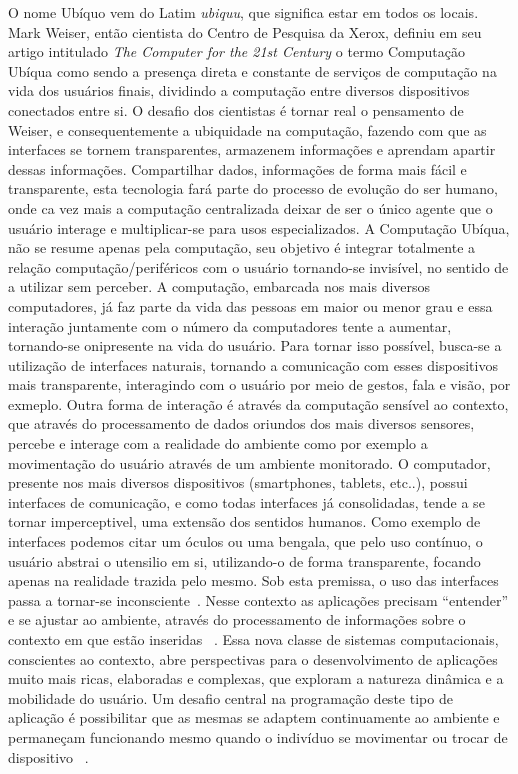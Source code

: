 \documentclass[12pt,a4paper,compsoc]{IEEEtran}
\begin{document}
O nome Ubíquo vem do Latim \textit{ubiquu}, que significa estar em todos os locais.    
Mark Weiser, então cientista do Centro de Pesquisa da Xerox, definiu em seu artigo intitulado  \textit{The Computer for the 21st Century} o termo Computação Ubíqua como sendo a presença direta e constante de serviços de computação na vida dos usuários finais, dividindo a computação entre diversos dispositivos conectados entre si.
O desafio dos cientistas é tornar real o pensamento de Weiser, e consequentemente a ubiquidade na computação, fazendo com que as interfaces se tornem transparentes, armazenem informações e aprendam apartir dessas informações. Compartilhar dados, informações de forma mais fácil e transparente, esta tecnologia fará parte do processo de evolução do ser humano, onde ca vez mais a computação centralizada deixar de ser o único agente que o usuário interage e multiplicar-se para usos especializados.
A Computação Ubíqua,  não se resume apenas pela computação, seu objetivo é integrar totalmente a relação computação/periféricos com o usuário tornando-se  invisível, no sentido de a utilizar sem perceber.
A computação, embarcada nos mais diversos computadores, já faz parte da vida das pessoas em maior ou menor grau e essa interação juntamente com o número da computadores tente a aumentar, tornando-se onipresente na vida do usuário. Para tornar isso possível, busca-se a utilização de interfaces naturais, tornando a comunicação com esses dispositivos mais transparente, interagindo com o usuário por meio de gestos, fala e visão, por exmeplo.
Outra forma de interação é através da computação sensível ao contexto, que através do processamento de dados oriundos dos mais diversos sensores, percebe e interage com a realidade do ambiente como por exemplo a movimentação do usuário através de um ambiente monitorado.    
O computador, presente nos mais diversos dispositivos (smartphones, tablets, etc..), possui interfaces de comunicação, e como todas interfaces já consolidadas, tende a se tornar imperceptivel, uma extensão dos sentidos humanos. Como exemplo de interfaces podemos citar um óculos ou uma bengala, que pelo uso contínuo, o usuário abstrai o utensilio em si, utilizando-o de forma transparente, focando apenas na realidade trazida pelo mesmo. Sob esta premissa, o uso das interfaces passa a tornar-se inconsciente~\cite{Weiser93}.
Nesse contexto as aplicações precisam “entender” e se ajustar ao ambiente, através do processamento de informações sobre o contexto em que estão inseridas ~\cite{Maciel}.
Essa nova classe de sistemas computacionais, conscientes ao contexto, abre perspectivas para o desenvolvimento de aplicações muito mais ricas, elaboradas e complexas, que exploram a natureza dinâmica e a mobilidade do usuário. Um desafio central na programação deste tipo de aplicação é possibilitar que as mesmas se adaptem continuamente ao ambiente e permaneçam funcionando mesmo quando o indivíduo se movimentar ou trocar de dispositivo ~\cite{GrimmB03, Cac08}.
\end{document}
